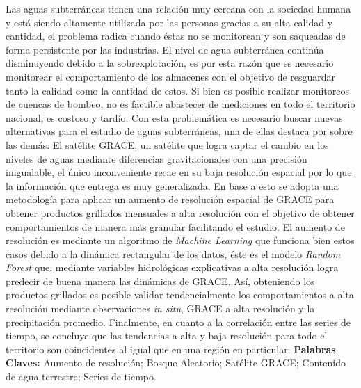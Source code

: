 Las aguas subterráneas tienen una relación muy cercana con la sociedad humana y está siendo altamente utilizada por las personas gracias a su
alta calidad y cantidad, el problema radica cuando éstas no se monitorean y son saqueadas de forma persistente por las industrias. El nivel de agua
subterránea continúa disminuyendo debido a la sobrexplotación, es por esta razón que es necesario monitorear el comportamiento de 
los almacenes con el objetivo de resguardar tanto la calidad como la cantidad de estos. Si bien es posible realizar monitoreos de cuencas de bombeo, no es 
factible abastecer de mediciones en todo el territorio nacional, es costoso y tardío. Con esta problemática es necesario buscar nuevas alternativas para el estudio de 
aguas subterráneas, una de ellas destaca por sobre las demás: El satélite GRACE, un satélite que logra captar el cambio en los niveles de aguas mediante diferencias gravitacionales con una precisión inigualable,
el único inconveniente recae en su baja resolución espacial por lo que la información que entrega es muy
generalizada. En base a esto se adopta una metodología para aplicar un aumento de resolución espacial de GRACE para obtener productos grillados mensuales a alta resolución con el 
objetivo de obtener comportamientos de manera más granular facilitando el estudio. El aumento de resolución es mediante un algoritmo de \textit{Machine Learning} que funciona bien estos casos 
debido a la dinámica rectangular de los datos, éste es el modelo \textit{Random Forest} que, mediante variables hidrológicas explicativas a alta resolución logra predecir de buena manera 
las dinámicas de GRACE. Así, obteniendo los productos grillados es posible validar tendencialmente
los comportamientos a alta resolución mediante observaciones \textit{in situ}, GRACE a alta resolución y la precipitación promedio.
Finalmente, en cuanto a la correlación entre las series de tiempo, se concluye que las tendencias a alta y baja resolución para todo el territorio son coincidentes al igual que en una región en particular.
\vskip 0.2in
\noindent
{\bf Palabras Claves:} Aumento de resolución; Bosque Aleatorio; Satélite GRACE; Contenido de agua terrestre; Series de tiempo.